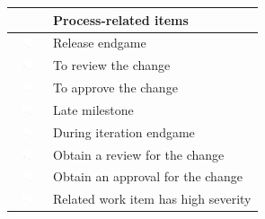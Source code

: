 \addtocounter{table}{1}
\begin{table}[t!]
\centering
\begin{tabular}{ll}
\toprule
\vspace{-2pt}& Process-related items\\
\midrule
\vspace{-2pt}\includegraphics[height=10px, width=30px]{figures/sparkles/during-release-endgame.pdf} & Release endgame\\
\vspace{-2pt}\includegraphics[height=10px, width=30px]{figures/sparkles/you-need-to-review-a-change.pdf} & To review the change\\
\vspace{-2pt}\includegraphics[height=10px, width=30px]{figures/sparkles/you-need-to-approve-a-change.pdf} & To approve the change\\
\vspace{-2pt}\includegraphics[height=10px, width=30px]{figures/sparkles/late-milestone.pdf} & Late milestone\\
\vspace{-2pt}\includegraphics[height=10px, width=30px]{figures/sparkles/during-iteration-endgame.pdf} & During iteration endgame\\
\vspace{-2pt}\includegraphics[height=10px, width=30px]{figures/sparkles/you-need-a-review-for-a-change.pdf} & Obtain a review for the change\\
\vspace{-2pt}\includegraphics[height=10px, width=30px]{figures/sparkles/you-need-an-approval-for-a-change.pdf} & Obtain an approval for the change\\
\vspace{-2pt}\includegraphics[height=10px, width=30px]{figures/sparkles/related-work-item-has-high-severity.pdf} & Related work item has high severity\\

\end{tabular}
\end{table}
